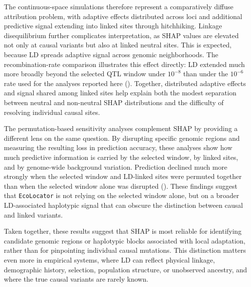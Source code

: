 \documentclass[]{article}
\newcommand{\ecolocator}{\texttt{EcoLocator}\xspace}
\begin{document}
The continuous-space simulations therefore represent
a comparatively diffuse attribution problem,
with adaptive effects distributed across loci
and additional predictive signal extending into linked sites
through hitchhiking.
Linkage disequilibrium further complicates interpretation,
as SHAP values are elevated not only at causal variants
but also at linked neutral sites.
This is expected,
because LD spreads adaptive signal
across genomic neighborhoods.
The recombination-rate comparison illustrates this effect directly:
LD extended much more broadly beyond the selected QTL window
under \(10^{-8}\) than under the \(10^{-6}\) rate
used for the analyses reported here
().
Together, distributed adaptive effects and signal shared among linked sites
help explain both the modest separation between neutral
and non-neutral SHAP distributions
and the difficulty of resolving individual causal sites.

The permutation-based sensitivity analyses
complement SHAP by providing a different lens
on the same question.
By disrupting specific genomic regions
and measuring the resulting loss in prediction accuracy,
these analyses show how much predictive information is carried
by the selected window,
by linked sites,
and by genome-wide background variation.
Prediction declined much more strongly
when the selected window and LD-linked sites were permuted together
than when the selected window alone was disrupted
().
These findings suggest that \ecolocator is not relying
on the selected window alone,
but on a broader LD-associated haplotypic signal
that can obscure the distinction between causal and linked variants.

Taken together, these results suggest that SHAP is most reliable for
identifying candidate genomic regions or haplotypic blocks associated
with local adaptation, rather than for pinpointing individual causal
mutations. This distinction matters even more in empirical systems,
where LD can reflect physical linkage, demographic history, selection,
population structure, or unobserved ancestry, and where the true
causal variants are rarely known.
\end{document}
